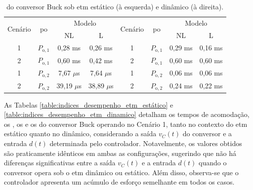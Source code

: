 \vspace{12pt}
\begin{table}[H]
  \centering
  \captionsetup{justification=centering}
  \setlength{\tabcolsep}{10pt}
  \begin{tabular}{cccccccc}
    \toprule
    \multirow{2}{*}{\centering Cenário} & \multirow{2}{*}{\centering \acrshort{po}} & \multicolumn{2}{c}{\centering Modelo} & \multirow{2}{*}{\centering Cenário} & \multirow{2}{*}{\centering \acrshort{po}} & \multicolumn{2}{c}{\centering Modelo}                     \\
    \cmidrule(lr){3-4} \cmidrule(lr){7-8}                      &                                           & NL                                    & L                                   &                                           &                                       & NL      & L       \\
    \midrule
    1                                   & $P_{\mathrm{o}, 1}$                       & 0,28 ms                               & 0,26 ms                             & 1                                         & $P_{\mathrm{o}, 1}$                   & 0,29 ms & 0,16 ms \\
    2                                   & $P_{\mathrm{o}, 1}$                       & 0,60 ms                               & 0,42 ms                             & 2                                         & $P_{\mathrm{o}, 1}$                   & 0,60 ms & 0,60 ms \\
    1                                   & $P_{\mathrm{o}, 2}$                       & 7,67 $\mu$s                           & 7,64 $\mu$s                         & 1                                         & $P_{\mathrm{o}, 2}$                   & 0,06 ms & 0,06 ms \\
    2                                   & $P_{\mathrm{o}, 2}$                       & 39,19 $\mu$s                          & 38,89 $\mu$s                        & 2                                         & $P_{\mathrm{o}, 2}$                   & 0,24 ms & 0,22 ms \\
    \bottomrule
  \end{tabular}
  \caption{ do conversor Buck sob \acrshort{etm} estático (à esquerda) e dinâmico (à direita).}
  \label{table:imees_buck_static_dynamic}
\end{table}

As Tabelas \ref{table:indices_desempenho_etm_estático} e \ref{table:indices_desempenho_etm_dinamico} detalham os tempos de acomodação, os , os  e os  do conversor Buck operando no Cenário 1, tanto no contexto do \acrshort{etm} estático quanto no dinâmico, considerando a saída $v_C(t)$ do conversor e a entrada $d(t)$ determinada pelo controlador. Notavelmente, os valores obtidos são praticamente idênticos em ambas as configurações, sugerindo que não há diferenças significativas entre a saída $v_C(t)$ e a entrada $d(t)$ quando o conversor opera sob o \acrshort{etm} dinâmico ou estático. Além disso, observa-se que o controlador apresenta um acúmulo de esforço semelhante em todos os casos. 

